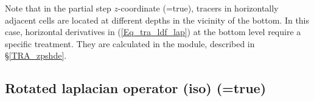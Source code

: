 \documentclass[NEMO_book]{subfiles}
\begin{document}
Note that in the partial step $z$-coordinate (=true), tracers in horizontally 
adjacent cells are located at different depths in the vicinity of the bottom. 
In this case, horizontal derivatives in (\ref{Eq_tra_ldf_lap}) at the bottom level 
require a specific treatment. They are calculated in the  module, 
described in \S\ref{TRA_zpshde}.

\subsection   [Rotated laplacian operator (iso) (\np{ln\_traldf\_lap})]
			{Rotated laplacian operator (iso) (=true)}
\label{TRA_ldf_iso}
\end{document}
